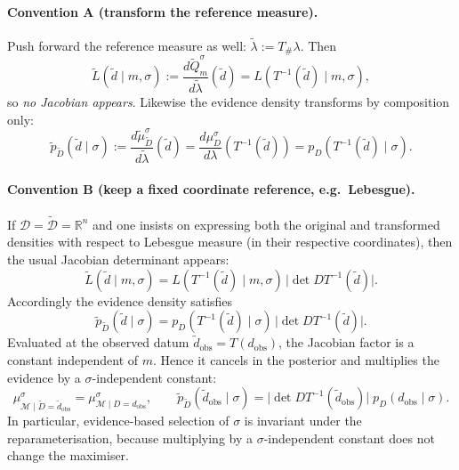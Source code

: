 \documentclass[11pt]{article}
\theoremstyle{remark}
\newcommand{\modelspace}{\mathcal{M}}
\newcommand{\dataspace}{\mathcal{D}}
\begin{document}
\paragraph{Convention A (transform the reference measure).}
Push forward the reference measure as well: \(\tilde\lambda := T_{\#}\lambda\). Then
\begin{equation}\label{eq:no-jacobian}
\tilde L(\tilde d\mid m,\sigma)
:=\frac{d\tilde Q_m^\sigma}{d\tilde\lambda}(\tilde d)
=
L(T^{-1}(\tilde d)\mid m,\sigma),
\end{equation}
so \emph{no Jacobian appears}. Likewise the evidence density transforms by composition only:
\[
\tilde p_{\tilde D}(\tilde d\mid\sigma)
:=\frac{d\tilde\mu_{\tilde D}^\sigma}{d\tilde\lambda}(\tilde d)
=
\frac{d\mu_D^\sigma}{d\lambda}(T^{-1}(\tilde d))
= p_D(T^{-1}(\tilde d)\mid\sigma).
\]

\paragraph{Convention B (keep a fixed coordinate reference, e.g.\ Lebesgue).}
If \(\dataspace=\tilde{\dataspace}=\mathbb R^n\) and one insists on expressing both the original and
transformed densities with respect to Lebesgue measure (in their respective coordinates), then the
usual Jacobian determinant appears:
\begin{equation}\label{eq:jacobian}
\tilde L(\tilde d\mid m,\sigma)
=
L(T^{-1}(\tilde d)\mid m,\sigma)\,\bigl|\det DT^{-1}(\tilde d)\bigr|.
\end{equation}
Accordingly the evidence density satisfies
\begin{equation}\label{eq:evidence-jacobian}
\tilde p_{\tilde D}(\tilde d\mid\sigma)
=
p_D(T^{-1}(\tilde d)\mid\sigma)\,\bigl|\det DT^{-1}(\tilde d)\bigr|.
\end{equation}
Evaluated at the observed datum \(\tilde d_{\mathrm{obs}}=T(d_{\mathrm{obs}})\), the Jacobian factor is
a constant independent of \(m\). Hence it cancels in the posterior and multiplies the evidence by a
\(\sigma\)-independent constant:
\[
\mu_{\modelspace\mid \tilde D=\tilde d_{\mathrm{obs}}}^\sigma
=
\mu_{\modelspace\mid D=d_{\mathrm{obs}}}^\sigma,
\qquad
\tilde p_{\tilde D}(\tilde d_{\mathrm{obs}}\mid\sigma)
=
\bigl|\det DT^{-1}(\tilde d_{\mathrm{obs}})\bigr|\; p_D(d_{\mathrm{obs}}\mid\sigma).
\]
In particular, evidence-based selection of \(\sigma\) is invariant under the reparameterisation,
because multiplying by a \(\sigma\)-independent constant does not change the maximiser.
\end{document}
